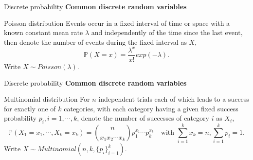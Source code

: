 \documentclass [aspectratio=169]{beamer}
\begin{document}
\begin{frame}{Discrete probability}
\textbf{Common discrete random variables}
\begin{block}{Poisson distribution}
Events occur in a fixed interval of time or space with a known constant mean rate $\lambda$ and independently of the time since the last event, then denote the number of events during the fixed interval as $X$, 
$$
\mathbb{P}(X = x) = \dfrac{\lambda^x}{x!}exp(-\lambda).
$$
Write $X \sim Poisson(\lambda)$.
\end{block}
\vspace{0.1in}
\end{frame}


\begin{frame}{Discrete probability}
\textbf{Common discrete random variables}
\begin{block}{Multinomial distribution}
For $n$ independent trials each of which leads to a success for exactly one of $k$ categories, with each category having a given fixed success probability $p_i, i =1, \cdots, k$, denote the number of successes of category $i$ as $X_i$, 
$$
\mathbb{P}(X_1 = x_1, \cdots, X_k = x_k) = \binom{n}{x_1 x_2 \cdots x_k}p_1^{x_1}\cdots p_k^{x_k}\quad \text{with } \sum_{i = 1}^k x_k = n, \sum_{i = 1}^k p_i = 1.
$$
Write $X \sim Multinomial(n, k, \{p_i\}_{i = 1}^k)$.
\end{block}
\end{frame}

\end{document}
